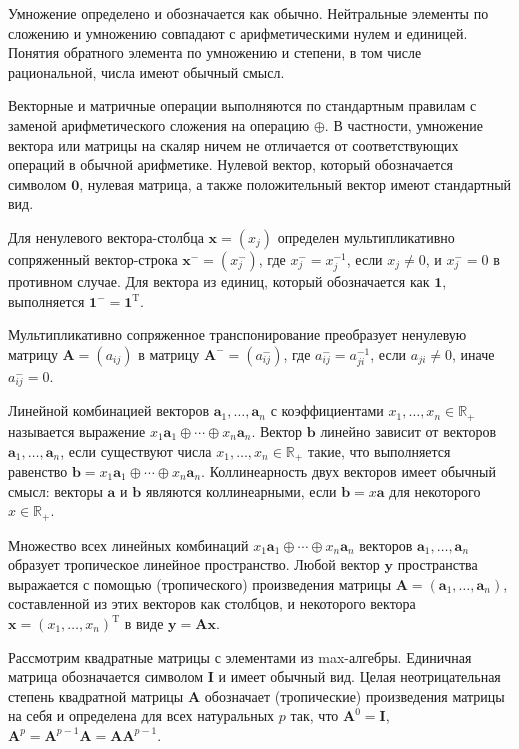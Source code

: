 \documentclass[specialist, substylefile = spbureport.rtx,
    subf,href,colorlinks=true, 12pt]{disser}
\begin{document}
        Умножение определено и обозначается как обычно. Нейтральные элементы по сложению и умножению совпадают с арифметическими нулем и единицей. Понятия обратного элемента по умножению и степени, в том числе рациональной, числа имеют обычный смысл. 
        
        Векторные и матричные операции выполняются по стандартным правилам с заменой арифметического сложения на операцию $\oplus$. В частности, умножение вектора или матрицы на скаляр ничем не отличается от соответствующих операций в обычной арифметике. Нулевой вектор, который обозначается символом $\bm{0}$, нулевая матрица, а также положительный вектор имеют стандартный вид.

        Для ненулевого вектора-столбца $\bm{x}=(x_{j})$ определен мультипликативно сопряженный вектор-строка $\bm{x}^{-}=(x_{j}^{-})$, где $x_{j}^{-}=x_{j}^{-1}$, если $x_{j}\ne0$, и $x_{j}^{-}=0$ в противном случае. Для вектора из единиц, который обозначается как $\bm{1}$, выполняется $\bm{1}^{-}=\bm{1}^{\mathrm{T}}$.
        
        Мультипликативно сопряженное транспонирование преобразует ненулевую матрицу $\bm{A}=(a_{ij})$ в матрицу $\bm{A}^{-}=(a_{ij}^{-})$, где $a_{ij}^{-}=a_{ji}^{-1}$, если $a_{ji}\ne0$, иначе $a_{ij}^{-}=0$.

        Линейной комбинацией векторов $\bm{a}_{1},\ldots,\bm{a}_{n}$ с коэффициентами $x_{1},\ldots,x_{n}\in\mathbb{R}_{+}$ называется выражение $x_{1}\bm{a}_{1}\oplus\cdots\oplus x_{n}\bm{a}_{n}$. Вектор $\bm{b}$ линейно зависит от векторов $\bm{a}_{1},\ldots,\bm{a}_{n}$, если существуют числа $x_{1},\ldots,x_{n}\in\mathbb{R}_{+}$ такие, что выполняется равенство $\bm{b}=x_{1}\bm{a}_{1}\oplus\cdots\oplus x_{n}\bm{a}_{n}$. Коллинеарность двух векторов имеет обычный смысл: векторы $\bm{a}$ и $\bm{b}$ являются коллинеарными, если $\bm{b}=x\bm{a}$ для некоторого $x\in\mathbb{R}_{+}$.

        Множество всех линейных комбинаций $x_{1}\bm{a}_{1}\oplus\cdots\oplus x_{n}\bm{a}_{n}$ векторов $\bm{a}_{1},\ldots,\bm{a}_{n}$ образует тропическое линейное пространство. Любой вектор $\bm{y}$ пространства выражается с помощью (тропического) произведения матрицы $\bm{A}=(\bm{a}_{1},\ldots,\bm{a}_{n})$, составленной из этих векторов как столбцов, и некоторого вектора $\bm{x}=(x_{1},\ldots,x_{n})^{\mathrm{T}}$ в виде $\bm{y}=\bm{A}\bm{x}$.

        Рассмотрим квадратные матрицы с элементами из max-алгебры. Единичная матрица обозначается символом $\bm{I}$ и имеет обычный вид. Целая неотрицательная степень квадратной матрицы $\bm{A}$ обозначает (тропические) произведения матрицы на себя и определена для всех натуральных $p$ так, что $\bm{A}^{0}=\bm{I}$, $\bm{A}^{p}=\bm{A}^{p-1}\bm{A}=\bm{A}\bm{A}^{p-1}$.
\end{document}

